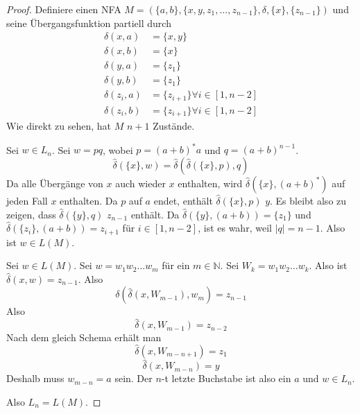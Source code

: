 \documentclass[10pt,a4paper]{article}
\begin{document}
\begin{proof}
  Definiere einen NFA $M = (\{ a, b \}, \{ x, y, z_{1}, \dots, z_{n - 1} \}, \delta, \{ x \}, \{ z_{n - 1} \})$ und seine Übergangsfunktion partiell durch
  \begin{align*}
    \delta(x, a) & = \{ x, y \}\\
    \delta(x, b) & = \{ x \}\\
    \delta(y, a) & = \{ z_{1} \}\\
    \delta(y, b) & = \{ z_{1} \}\\
    \delta(z_{i}, a) & = \{ z_{i + 1} \} \forall i \in [1, n - 2]\\
    \delta(z_{i}, b) & = \{ z_{i + 1} \} \forall i \in [1, n - 2]
  \end{align*}
  Wie direkt zu sehen, hat $M$ $n + 1$ Zustände.

  Sei $w \in L_{n}$.
  Sei $w = pq$, wobei $p = (a + b)^{*}a$ und $q = (a + b)^{n - 1}$.
  \begin{equation}
    \hat{\delta}(\{ x \}, w) = \hat{\delta}(\hat{\delta}(\{ x \}, p), q)
  \end{equation}
  Da alle Übergänge von $x$ auch wieder $x$ enthalten, wird $\hat{\delta}(\{ x \}, (a + b)^{*})$ auf jeden Fall $x$ enthalten.
  Da $p$ auf $a$ endet, enthält $\hat{\delta}(\{ x \}, p)$ $y$.
  Es bleibt also zu zeigen, dass $\hat{\delta}(\{ y \}, q)$ $z_{n - 1}$ enthält.
  Da $\hat{\delta}(\{ y \}, (a + b)) = \{ z_{1} \}$ und $\hat{\delta}(\{ z_{i} \}, (a + b)) = z_{i + 1}$ für $i \in [1, n - 2]$, ist es wahr, weil $|q| = n - 1$.
  Also ist $w \in L(M)$.

  Sei $w \in L(M)$.
  Sei $w = w_{1}w_{2}\dots w_{m}$ für ein $m \in \mathbb{N}$.
  Sei $W_{k} = w_{1}w_{2} \dots w_{k}$.
  Also ist $\hat{\delta}(x, w) = z_{n - 1}$.
  Also
  \begin{equation}
    \delta(\hat{\delta}(x, W_{m - 1}), w_{m}) = z_{n - 1}
  \end{equation}
  Also
  \begin{equation}
    \hat{\delta}(x, W_{m - 1}) = z_{n - 2}
  \end{equation}
  Nach dem gleich Schema erhält man
  \begin{equation}
    \hat{\delta}(x, W_{m - n + 1}) = z_{1}
  \end{equation}
  \begin{equation}
    \hat{\delta}(x, W_{m - n}) = y
  \end{equation}
  Deshalb muss $w_{m - n} = a$ sein.
  Der $n$-t letzte Buchstabe ist also ein $a$ und $w \in L_{n}$.

  Also $L_{n} = L(M)$.
\end{proof}
\end{document}
